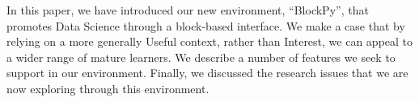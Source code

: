 \documentclass{sig-alternate}
\begin{document}
In this paper, we have introduced our new environment, ``BlockPy'', that promotes Data Science through a block-based interface.
We make a case that by relying on a more generally Useful context, rather than Interest, we can appeal to a wider range of mature learners.
We describe a number of features we seek to support in our environment.
Finally, we discussed the research issues that we are now exploring through this environment.


\end{document}
